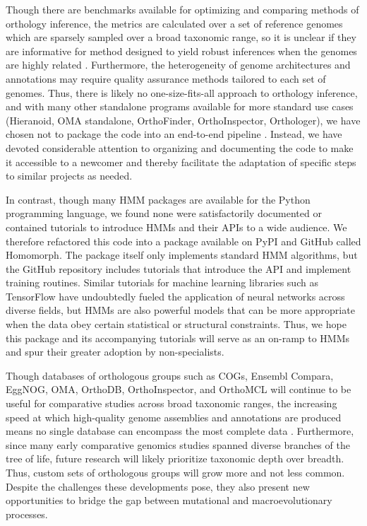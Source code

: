 \documentclass[10pt,letterpaper]{article}
\begin{document}
Though there are benchmarks available for optimizing and comparing methods of orthology inference, the metrics are calculated over a set of reference genomes which are sparsely sampled over a broad taxonomic range, so it is unclear if they are informative for method designed to yield robust inferences when the genomes are highly related \cite{Nevers2022}. Furthermore, the heterogeneity of genome architectures and annotations may require quality assurance methods tailored to each set of genomes. Thus, there is likely no one-size-fits-all approach to orthology inference, and with many other standalone programs available for more standard use cases (Hieranoid, OMA standalone, OrthoFinder, OrthoInspector, Orthologer), we have chosen not to package the code into an end-to-end pipeline \cite{Kaduk2017, Altenhoff2019, Emms2019, Linard2014, Zdobnov2020}. Instead, we have devoted considerable attention to organizing and documenting the code to make it accessible to a newcomer and thereby facilitate the adaptation of specific steps to similar projects as needed.

In contrast, though many HMM packages are available for the Python programming language, we found none were satisfactorily documented or contained tutorials to introduce HMMs and their APIs to a wide audience. We therefore refactored this code into a package available on PyPI and GitHub called Homomorph. The package itself only implements standard HMM algorithms, but the GitHub repository includes tutorials that introduce the API and implement training routines. Similar tutorials for machine learning libraries such as TensorFlow have undoubtedly fueled the application of neural networks across diverse fields, but HMMs are also powerful models that can be more appropriate when the data obey certain statistical or structural constraints. Thus, we hope this package and its accompanying tutorials will serve as an on-ramp to HMMs and spur their greater adoption by non-specialists.

Though databases of orthologous groups such as COGs, Ensembl Compara, EggNOG, OMA, OrthoDB, OrthoInspector, and OrthoMCL will continue to be useful for comparative studies across broad taxonomic ranges, the increasing speed at which high-quality genome assemblies and annotations are produced means no single database can encompass the most complete data \cite{Galperin2020, Herrero2016, HuertaCepas2018, Altenhoff2020, Zdobnov2020, Nevers2018, Chen2006}. Furthermore, since many early comparative genomics studies spanned diverse branches of the tree of life, future research will likely prioritize taxonomic depth over breadth. Thus, custom sets of orthologous groups will grow more and not less common. Despite the challenges these developments pose, they also present new opportunities to bridge the gap between mutational and macroevolutionary processes.
\end{document}
